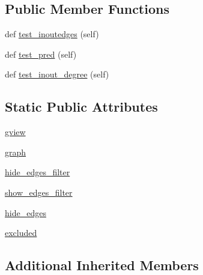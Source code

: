 \subsection*{Public Member Functions}
\begin{DoxyCompactItemize}
\item 
def \hyperlink{classnetworkx_1_1classes_1_1tests_1_1test__subgraphviews_1_1TestSubDiGraphView_abf1905e316548d336072ebbd91c88636}{test\+\_\+inoutedges} (self)
\item 
def \hyperlink{classnetworkx_1_1classes_1_1tests_1_1test__subgraphviews_1_1TestSubDiGraphView_a79033772f62aa9fe0b1cc14223eb936e}{test\+\_\+pred} (self)
\item 
def \hyperlink{classnetworkx_1_1classes_1_1tests_1_1test__subgraphviews_1_1TestSubDiGraphView_aa928daacacb59be3529baba1708a3ff1}{test\+\_\+inout\+\_\+degree} (self)
\end{DoxyCompactItemize}
\subsection*{Static Public Attributes}
\begin{DoxyCompactItemize}
\item 
\hyperlink{classnetworkx_1_1classes_1_1tests_1_1test__subgraphviews_1_1TestSubDiGraphView_abc7813ab86713120abc8961f317a53f4}{gview}
\item 
\hyperlink{classnetworkx_1_1classes_1_1tests_1_1test__subgraphviews_1_1TestSubDiGraphView_a88c79046e2e2e919a658ba90c107b30b}{graph}
\item 
\hyperlink{classnetworkx_1_1classes_1_1tests_1_1test__subgraphviews_1_1TestSubDiGraphView_a7126cb4dc2b9f87097b56f5451d44a6f}{hide\+\_\+edges\+\_\+filter}
\item 
\hyperlink{classnetworkx_1_1classes_1_1tests_1_1test__subgraphviews_1_1TestSubDiGraphView_a7795b2ade72b8fc3fdbcac57a369b4cd}{show\+\_\+edges\+\_\+filter}
\item 
\hyperlink{classnetworkx_1_1classes_1_1tests_1_1test__subgraphviews_1_1TestSubDiGraphView_a18d30a585f8c3fd5065748431fcb9b4b}{hide\+\_\+edges}
\item 
\hyperlink{classnetworkx_1_1classes_1_1tests_1_1test__subgraphviews_1_1TestSubDiGraphView_ac5c9c3aeaf80d2fc21c8d194fab7c31a}{excluded}
\end{DoxyCompactItemize}
\subsection*{Additional Inherited Members}


